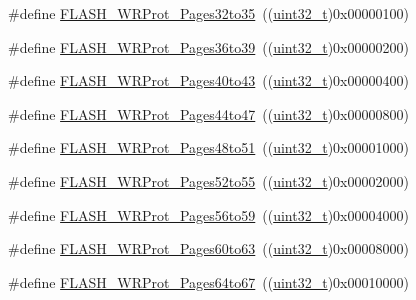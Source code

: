 \begin{DoxyCompactItemize}
\#define \hyperlink{group___option___bytes___write___protection_ga81a4250850e5fe7c251365cc22839a96}{F\+L\+A\+S\+H\+\_\+\+W\+R\+Prot\+\_\+\+Pages32to35}~((\hyperlink{_p_e___types_8h_a33594304e786b158f3fb30289278f5af}{uint32\+\_\+t})0x00000100)
\item 
\#define \hyperlink{group___option___bytes___write___protection_ga783f47425af52b9a12914520d9ee175e}{F\+L\+A\+S\+H\+\_\+\+W\+R\+Prot\+\_\+\+Pages36to39}~((\hyperlink{_p_e___types_8h_a33594304e786b158f3fb30289278f5af}{uint32\+\_\+t})0x00000200)
\item 
\#define \hyperlink{group___option___bytes___write___protection_ga30798723c36db2b8145b6a5c8ffafded}{F\+L\+A\+S\+H\+\_\+\+W\+R\+Prot\+\_\+\+Pages40to43}~((\hyperlink{_p_e___types_8h_a33594304e786b158f3fb30289278f5af}{uint32\+\_\+t})0x00000400)
\item 
\#define \hyperlink{group___option___bytes___write___protection_gaa2d897455d5f71c9fd3721d49b3578fc}{F\+L\+A\+S\+H\+\_\+\+W\+R\+Prot\+\_\+\+Pages44to47}~((\hyperlink{_p_e___types_8h_a33594304e786b158f3fb30289278f5af}{uint32\+\_\+t})0x00000800)
\item 
\#define \hyperlink{group___option___bytes___write___protection_gac6bb79080cb276b330499f26c706048e}{F\+L\+A\+S\+H\+\_\+\+W\+R\+Prot\+\_\+\+Pages48to51}~((\hyperlink{_p_e___types_8h_a33594304e786b158f3fb30289278f5af}{uint32\+\_\+t})0x00001000)
\item 
\#define \hyperlink{group___option___bytes___write___protection_gab5beefbfebf060f71421995f3c7a6418}{F\+L\+A\+S\+H\+\_\+\+W\+R\+Prot\+\_\+\+Pages52to55}~((\hyperlink{_p_e___types_8h_a33594304e786b158f3fb30289278f5af}{uint32\+\_\+t})0x00002000)
\item 
\#define \hyperlink{group___option___bytes___write___protection_ga3705c210feeeb63c31976495c0b851f1}{F\+L\+A\+S\+H\+\_\+\+W\+R\+Prot\+\_\+\+Pages56to59}~((\hyperlink{_p_e___types_8h_a33594304e786b158f3fb30289278f5af}{uint32\+\_\+t})0x00004000)
\item 
\#define \hyperlink{group___option___bytes___write___protection_ga1978945fc02d1867900f17c4999c50d5}{F\+L\+A\+S\+H\+\_\+\+W\+R\+Prot\+\_\+\+Pages60to63}~((\hyperlink{_p_e___types_8h_a33594304e786b158f3fb30289278f5af}{uint32\+\_\+t})0x00008000)
\item 
\#define \hyperlink{group___option___bytes___write___protection_ga124928d6134ddac13e3e8810a0d8dd1a}{F\+L\+A\+S\+H\+\_\+\+W\+R\+Prot\+\_\+\+Pages64to67}~((\hyperlink{_p_e___types_8h_a33594304e786b158f3fb30289278f5af}{uint32\+\_\+t})0x00010000)
\item 

\end{DoxyCompactItemize}
